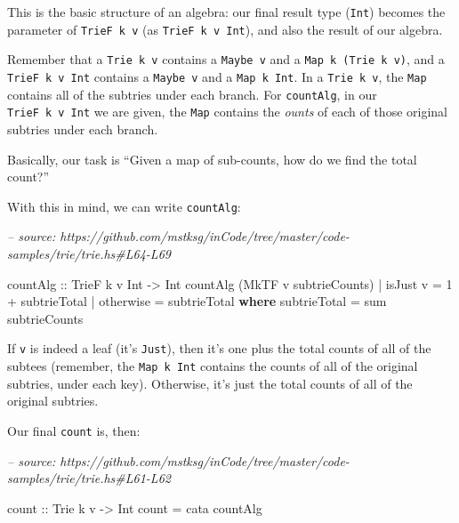 \documentclass[]{article}
\newenvironment{Shaded}{}{}
\newcommand{\CommentTok}[1]{\textcolor[rgb]{0.38,0.63,0.69}{\textit{#1}}}
\newcommand{\DataTypeTok}[1]{\textcolor[rgb]{0.56,0.13,0.00}{#1}}
\newcommand{\DecValTok}[1]{\textcolor[rgb]{0.25,0.63,0.44}{#1}}
\newcommand{\FunctionTok}[1]{\textcolor[rgb]{0.02,0.16,0.49}{#1}}
\newcommand{\KeywordTok}[1]{\textcolor[rgb]{0.00,0.44,0.13}{\textbf{#1}}}
\newcommand{\NormalTok}[1]{#1}
\newcommand{\OtherTok}[1]{\textcolor[rgb]{0.00,0.44,0.13}{#1}}
\begin{document}
This is the basic structure of an algebra: our final result type (\texttt{Int})
becomes the parameter of \texttt{TrieF\ k\ v} (as \texttt{TrieF\ k\ v\ Int}),
and also the result of our algebra.

Remember that a \texttt{Trie\ k\ v} contains a \texttt{Maybe\ v} and a
\texttt{Map\ k\ (Trie\ k\ v)}, and a \texttt{TrieF\ k\ v\ Int} contains a
\texttt{Maybe\ v} and a \texttt{Map\ k\ Int}. In a \texttt{Trie\ k\ v}, the
\texttt{Map} contains all of the subtries under each branch. For
\texttt{countAlg}, in our \texttt{TrieF\ k\ v\ Int} we are given, the
\texttt{Map} contains the \emph{ounts} of each of those original subtries under
each branch.

Basically, our task is ``Given a map of sub-counts, how do we find the total
count?''

With this in mind, we can write \texttt{countAlg}:

\begin{Shaded}
\begin{Highlighting}[]
\CommentTok{-- source: https://github.com/mstksg/inCode/tree/master/code-samples/trie/trie.hs#L64-L69}

\OtherTok{countAlg ::} \DataTypeTok{TrieF}\NormalTok{ k v }\DataTypeTok{Int} \OtherTok{->} \DataTypeTok{Int}
\NormalTok{countAlg (}\DataTypeTok{MkTF}\NormalTok{ v subtrieCounts)}
    \FunctionTok{|}\NormalTok{ isJust v  }\FunctionTok{=} \DecValTok{1} \FunctionTok{+}\NormalTok{ subtrieTotal}
    \FunctionTok{|}\NormalTok{ otherwise }\FunctionTok{=}\NormalTok{ subtrieTotal}
  \KeywordTok{where}
\NormalTok{    subtrieTotal }\FunctionTok{=}\NormalTok{ sum subtrieCounts}
\end{Highlighting}
\end{Shaded}

If \texttt{v} is indeed a leaf (it's \texttt{Just}), then it's one plus the
total counts of all of the subtees (remember, the \texttt{Map\ k\ Int} contains
the counts of all of the original subtries, under each key). Otherwise, it's
just the total counts of all of the original subtries.

Our final \texttt{count} is, then:

\begin{Shaded}
\begin{Highlighting}[]
\CommentTok{-- source: https://github.com/mstksg/inCode/tree/master/code-samples/trie/trie.hs#L61-L62}

\OtherTok{count ::} \DataTypeTok{Trie}\NormalTok{ k v }\OtherTok{->} \DataTypeTok{Int}
\NormalTok{count }\FunctionTok{=}\NormalTok{ cata countAlg}
\end{Highlighting}
\end{Shaded}
\end{document}

